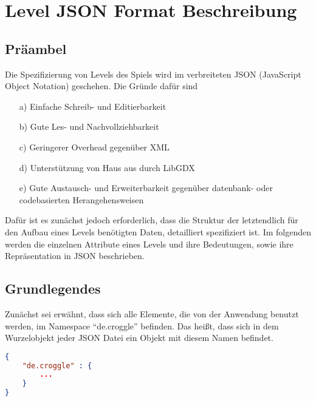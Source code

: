 
\chapter{Level JSON Format Beschreibung}
\section{Präambel}
Die Spezifizierung von Levels des Spiels wird im verbreiteten JSON (JavaScript Object Notation) geschehen.
Die Gründe dafür sind
\begin{itemize}
	\item[a)] Einfache Schreib- und Editierbarkeit
	\item[b)] Gute Les- und Nachvollziehbarkeit
	\item[c)] Geringerer Overhead gegenüber XML
	\item[d)] Unterstützung von Haus aus durch LibGDX
	\item[e)] Gute Austausch- und Erweiterbarkeit gegenüber datenbank- oder codebasierten Herangehensweisen
\end{itemize}
Dafür ist es zunächst jedoch erforderlich, dass die Struktur der letztendlich für den Aufbau eines Levels benötigten Daten, detailliert spezifiziert ist.
Im folgenden werden die einzelnen Attribute eines Levels und ihre Bedeutungen, sowie ihre Repräsentation in JSON beschrieben.

\section{Grundlegendes}
Zunächst sei erwähnt, dass sich alle Elemente, die von der Anwendung benutzt werden, im Namespace "`de.croggle"' befinden.
Das heißt, dass sich in dem Wurzelobjekt jeder JSON Datei ein Objekt mit diesem Namen befindet.
\begin{lstlisting}[language=json,caption={Standardinhalt jeder JSON Datei der Anwendung}]
{
	"de.croggle" : {
		...
	}
}
\end{lstlisting}

